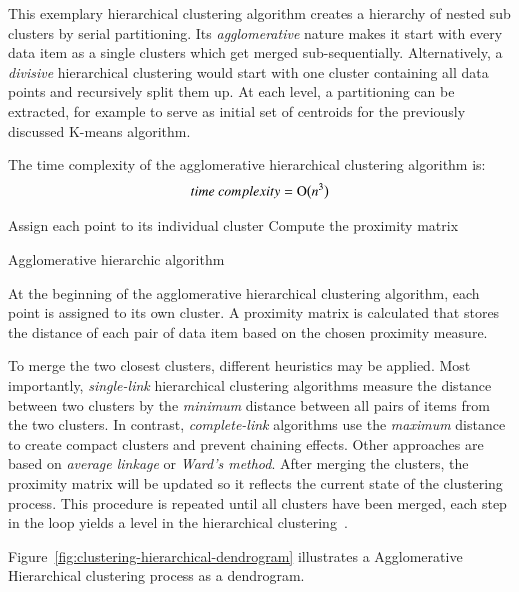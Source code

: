 This exemplary hierarchical clustering algorithm creates a hierarchy of nested sub clusters by serial partitioning. Its \textit{agglomerative} nature makes it start with every data item as a single clusters which get merged sub-sequentially. Alternatively, a \textit{divisive} hierarchical clustering would start with one cluster containing all data points and recursively split them up. At each level, a partitioning can be extracted, for example to serve as initial set of centroids for the previously discussed K-means algorithm. 

The time complexity of the agglomerative hierarchical clustering algorithm is:
\[time~complexity = \operatorname{O}\bigl(n^3\bigr)\]

\begin{algorithm}[t]
  {Assign each point to its individual cluster}\;
  {Compute the proximity matrix}\;
  \caption{Agglomerative hierarchic algorithm~\cite{Meert06clustermaps}}
  \label{alg:hierarchical}
\end{algorithm}

At the beginning of the agglomerative hierarchical clustering algorithm, each point is assigned to its own cluster. A proximity matrix is calculated that stores the distance of each pair of data item based on the chosen proximity measure.

To merge the two closest clusters, different heuristics may be applied. Most importantly, \textit{single-link} hierarchical clustering algorithms measure the distance between two clusters by the \textit{minimum} distance between all pairs of items from the two clusters. In contrast, \textit{complete-link} algorithms use the \textit{maximum} distance to create compact clusters and prevent chaining effects. Other approaches are based on \textit{average linkage} or \textit{Ward's method}. After merging the clusters, the proximity matrix will be updated so it reflects the current state of the clustering process. This procedure is repeated until all clusters have been merged, each step in the loop yields a level in the hierarchical clustering~\cite{Jain88clustering, Jain99clusterreview, Meert06clustermaps}.

Figure~\ref{fig:clustering-hierarchical-dendrogram} illustrates a Agglomerative Hierarchical clustering process as a dendrogram.

